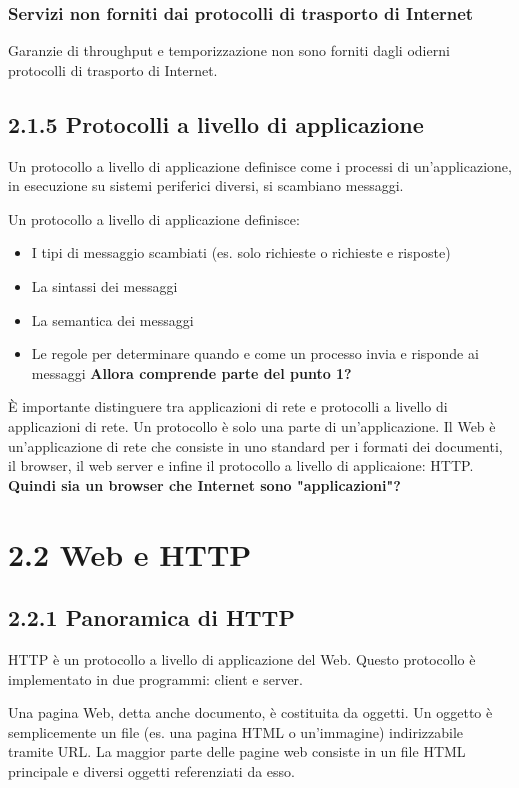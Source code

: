 \documentclass{book}
\begin{document}
\subsubsection*{Servizi non forniti dai protocolli di trasporto di Internet}
Garanzie di throughput e temporizzazione non sono forniti dagli odierni protocolli di trasporto di Internet.

\subsection*{2.1.5 Protocolli a livello di applicazione}
Un protocollo a livello di applicazione definisce come i processi di un'applicazione, in esecuzione su sistemi periferici diversi, si scambiano messaggi.

Un protocollo a livello di applicazione definisce:
\begin{itemize}
	\item I tipi di messaggio scambiati (es. solo richieste o richieste e risposte)
	\item La sintassi dei messaggi
	\item La semantica dei messaggi
	\item Le regole per determinare quando e come un processo invia e risponde ai messaggi \textbf{Allora comprende parte del punto 1?}
\end{itemize}

È importante distinguere tra applicazioni di rete e protocolli a livello di applicazioni di rete. Un protocollo è solo una parte di un'applicazione. Il Web è un'applicazione di rete che consiste in uno standard per i formati dei documenti, il browser, il web server e infine il protocollo a livello di applicaione: HTTP. \textbf{Quindi sia un browser che Internet sono "applicazioni"?}

\section*{2.2 Web e HTTP}
\subsection*{2.2.1 Panoramica di HTTP}
HTTP è un protocollo a livello di applicazione del Web. Questo protocollo è implementato in due programmi: client e server.

Una pagina Web, detta anche documento, è costituita da oggetti. Un oggetto è semplicemente un file (es. una pagina HTML o un'immagine) indirizzabile tramite URL. La maggior parte delle pagine web consiste in un file HTML principale e diversi oggetti referenziati da esso.
\end{document}
